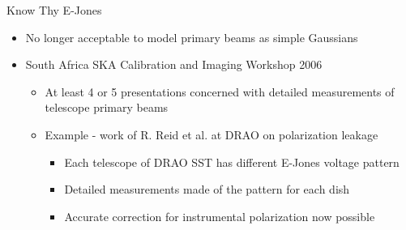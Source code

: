 \documentclass[pdf,azure,slideColor,colorBG]{prosper}
\begin{document}
\begin{slide}{Know Thy E-Jones}
\begin{small}
\begin{itemize}
\item No longer acceptable to model primary beams as simple Gaussians
\item South Africa SKA Calibration and Imaging Workshop 2006 
\begin{itemize}
\item At least 4 or 5 presentations concerned with detailed measurements of telescope primary beams
\item Example - work of R. Reid et al. at DRAO on polarization leakage
\begin{itemize}
\item Each telescope of DRAO SST has different E-Jones voltage pattern
\item Detailed measurements made of the pattern for each dish
\item Accurate correction for instrumental polarization now possible   
\end{itemize}
\end{itemize}
\end{itemize}
\end {small}
\end{slide}
\end{document}

